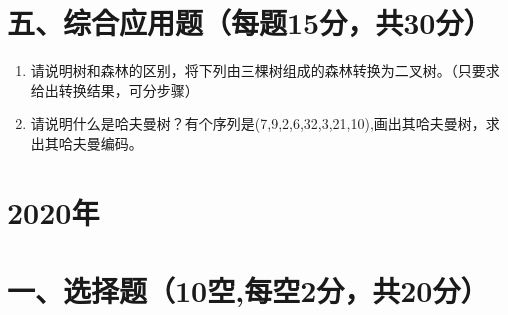 \documentclass{../../note}
\begin{document}
\vspace{1cm}


\section*{五、综合应用题（每题15分，共30分）}

\begin{enumerate}
\item 请说明树和森林的区别，将下列由三棵树组成的森林转换为二叉树。（只要求给出转换结果，可分步骤）

\item 请说明什么是哈夫曼树？有个序列是(7,9,2,6,32,3,21,10),画出其哈夫曼树，求出其哈夫曼编码。
\end{enumerate}


\newpage

\section*{2020年}

\vspace{1cm}


\section*{一、选择题（10空,每空2分，共20分）}
\end{document}
